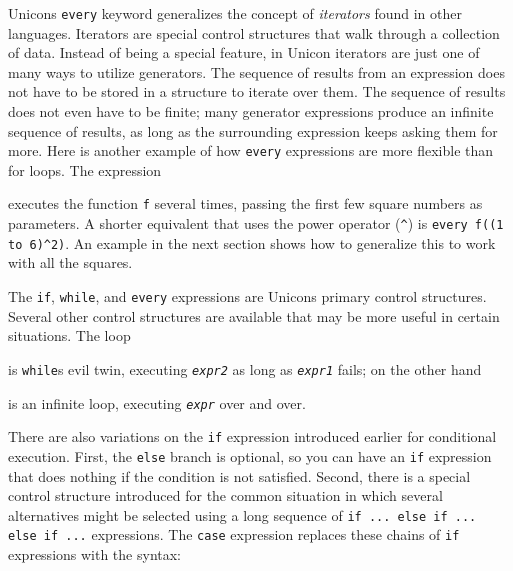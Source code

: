 Unicon{\textquotesingle}s \texttt{every} keyword generalizes the concept
of \textit{iterator}\textit{s} found in other languages.
Iterators are special control structures that walk
through a collection of data. Instead of being a special feature, in
Unicon iterators are just one of many ways to utilize generators. The
sequence of results from an expression does
not have to be stored in a structure to iterate over them. The sequence
of results does not even have to be finite; many
generator expressions produce an infinite sequence of
results, as long as the surrounding expression keeps asking them for
more. Here is another example of how \texttt{every} expressions are
more flexible than for loops. The expression


\noindent
executes the function \texttt{f} several times, passing the first few
square numbers as parameters. A shorter equivalent that uses the power
operator (\texttt{\^{}}) is \texttt{every f((1 to 6)\^{}2)}. An example
in the next section shows how to generalize this to work with all the
squares.

The \texttt{if}, \texttt{while}, and \texttt{every} expressions are
Unicon{\textquotesingle}s primary control structures. Several other
control structures are available that may be more useful in certain
situations. The loop


\noindent is \texttt{while}{\textquotesingle}s evil twin, executing
\texttt{\textit{expr2}} as long as \texttt{\textit{expr1}}
fails; on the other hand


\noindent is an infinite loop, executing \texttt{\textit{expr}}
over and over.

There are also variations on the \texttt{if} expression introduced
earlier for conditional execution. First, the \texttt{else} branch is
optional, so you can have an \texttt{if} expression that does nothing
if the condition is not satisfied. Second, there is a special control
structure introduced for the common situation in which several
alternatives might be selected using a long sequence of \texttt{if ...
else if ... else if ...} expressions. The \texttt{case} expression replaces these chains of
\texttt{if} expressions with the syntax:

